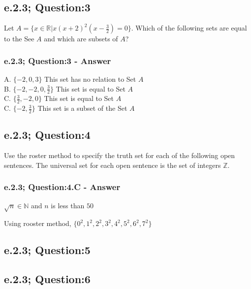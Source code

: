 \subsection{e.2.3; Question:3}
Let $A = \{ x \in \mathbb{R} | x(x+2)^2(x- \frac{3}{2})=0 \}$. Which of the following sets are equal to the See $A$ and which are subsets of $A$?

\subsubsection*{e.2.3; Question:3 - Answer}
A. $\{-2, 0 , 3  \}$ This set has no relation to Set $A$ \\
B. $\{-2, -2, 0 , \frac{3}{2}  \}$ This set is equal to Set $A$ \\
C. $\{ \frac{3}{2}, -2, 0  \}$ This set is equal to Set $A$ \\
C. $\{-2, \frac{3}{2}  \}$ This set is a  subset of the Set $A$ \\


\subsection{e.2.3; Question:4}
Use the roster method to specify the truth set for each of the following open sentences. The universal set for each open sentence is the set of integers $\mathbb{Z}$. \\


\subsubsection*{e.2.3; Question:4.C - Answer}
	\begin{center}
		$\sqrt{n} \in \mathbb{N}$ and $n$ is less than $50$
	\end{center}
Using rooster method, $\{0^2, 1^2, 2^2, 3^2, 4^2, 5^2, 6^2, 7^2 \}$ \\

\subsection{e.2.3; Question:5}

\subsection{e.2.3; Question:6}


\newpage
